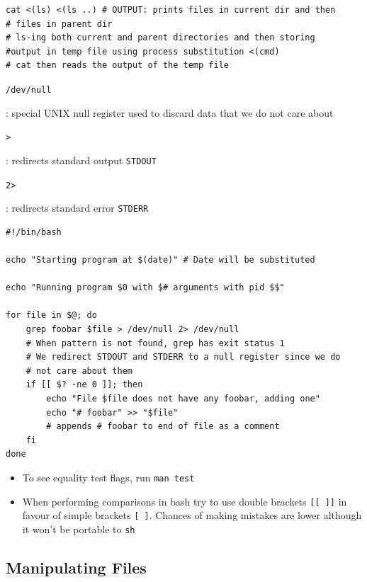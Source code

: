 \documentclass[letterpaper,12pt]{article}
\newcommand*{\lstitem}[1]{
  \setbox0\hbox{\lstinline{#1}}
  \item[\usebox0]
}
\begin{document}
\begin{lstlisting}
cat <(ls) <(ls ..) # OUTPUT: prints files in current dir and then
# files in parent dir
# ls-ing both current and parent directories and then storing
#output in temp file using process substitution <(cmd)
# cat then reads the output of the temp file
\end{lstlisting}

\begin{description}
 \lstitem{/dev/null}: special UNIX null register used to discard data that we do not care about
 \lstitem{>}: redirects standard output \lstinline{STDOUT}
 \lstitem{2>}: redirects standard error \lstinline{STDERR}
\end{description}

\begin{lstlisting}
#!/bin/bash

echo "Starting program at $(date)" # Date will be substituted

echo "Running program $0 with $# arguments with pid $$"

for file in $@; do
    grep foobar $file > /dev/null 2> /dev/null
    # When pattern is not found, grep has exit status 1
    # We redirect STDOUT and STDERR to a null register since we do
    # not care about them
    if [[ $? -ne 0 ]]; then
        echo "File $file does not have any foobar, adding one"
        echo "# foobar" >> "$file"
        # appends # foobar to end of file as a comment
    fi
done
\end{lstlisting}

\begin{itemize}
 \item To see equality test flags, run \lstinline{man test}
 \item When performing comparisons in bash try to use double brackets \lstinline{[[ ]]} in favour of simple brackets \lstinline{[ ]}. Chances of making mistakes are lower although it won’t be portable to \lstinline{sh}
\end{itemize}

\subsection{Manipulating Files}
\end{document}
